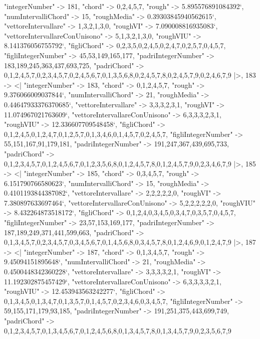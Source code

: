 \documentclass[
]{article}
\begin{document}
\begin{DatasetVerbatim}
    "integerNumber" -> 181,
    "chord" -> {0,2,4,5,7},
    "rough" -> 5.895576891084392`,
    "numIntervalliChord" -> 15,
    "roughMedia" -> 0.39303845940562615`,
    "vettoreIntervallare" -> {1,3,2,1,3,0},
    "roughVI" -> 7.090008816935083`,
    "vettoreIntervallareConUnisono" -> {5,1,3,2,1,3,0},
    "roughVIU" -> 8.141376056755792`,
    "figliChord" -> {{0,2,3,5},{0,2,4,5},{0,2,4,7},{0,2,5,7},{0,4,5,7}},
    "figliIntegerNumber" -> {45,53,149,165,177},
    "padriIntegerNumber" -> {183,189,245,363,437,693,725},
    "padriChord" -> {{0,1,2,4,5,7},{0,2,3,4,5,7},{0,2,4,5,6,7},{0,1,3,5,6,8},{0,2,4,5,7,8},{0,2,4,5,7,9},{0,2,4,6,7,9}}
  |>,
  183 -> <|
    "integerNumber" -> 183,
    "chord" -> {0,1,2,4,5,7},
    "rough" -> 9.376066009037844`,
    "numIntervalliChord" -> 21,
    "roughMedia" -> 0.44647933376370685`,
    "vettoreIntervallare" -> {3,3,3,2,3,1},
    "roughVI" -> 11.074967021763609`,
    "vettoreIntervallareConUnisono" -> {6,3,3,3,2,3,1},
    "roughVIU" -> 12.336607709548458`,
    "figliChord" -> {{0,1,2,4,5},{0,1,2,4,7},{0,1,2,5,7},{0,1,3,4,6},{0,1,4,5,7},{0,2,4,5,7}},
    "figliIntegerNumber" -> {55,151,167,91,179,181},
    "padriIntegerNumber" -> {191,247,367,439,695,733},
    "padriChord" -> {{0,1,2,3,4,5,7},{0,1,2,4,5,6,7},{0,1,2,3,5,6,8},{0,1,2,4,5,7,8},{0,1,2,4,5,7,9},{0,2,3,4,6,7,9}}
  |>,
  185 -> <|
    "integerNumber" -> 185,
    "chord" -> {0,3,4,5,7},
    "rough" -> 6.151790766580623`,
    "numIntervalliChord" -> 15,
    "roughMedia" -> 0.4101193844387082`,
    "vettoreIntervallare" -> {2,2,2,2,2,0},
    "roughVI" -> 7.380897633697464`,
    "vettoreIntervallareConUnisono" -> {5,2,2,2,2,2,0},
    "roughVIU" -> 8.432264873518172`,
    "figliChord" -> {{0,1,2,4},{0,3,4,5},{0,3,4,7},{0,3,5,7},{0,4,5,7}},
    "figliIntegerNumber" -> {23,57,153,169,177},
    "padriIntegerNumber" -> {187,189,249,371,441,599,663},
    "padriChord" -> {{0,1,3,4,5,7},{0,2,3,4,5,7},{0,3,4,5,6,7},{0,1,4,5,6,8},{0,3,4,5,7,8},{0,1,2,4,6,9},{0,1,2,4,7,9}}
  |>,
  187 -> <|
    "integerNumber" -> 187,
    "chord" -> {0,1,3,4,5,7},
    "rough" -> 9.45094151895648`,
    "numIntervalliChord" -> 21,
    "roughMedia" -> 0.4500448342360228`,
    "vettoreIntervallare" -> {3,3,3,3,2,1},
    "roughVI" -> 11.192302875457429`,
    "vettoreIntervallareConUnisono" -> {6,3,3,3,3,2,1},
    "roughVIU" -> 12.453943563242277`,
    "figliChord" -> {{0,1,3,4,5},{0,1,3,4,7},{0,1,3,5,7},{0,1,4,5,7},{0,2,3,4,6},{0,3,4,5,7}},
    "figliIntegerNumber" -> {59,155,171,179,93,185},
    "padriIntegerNumber" -> {191,251,375,443,699,749},
    "padriChord" -> {{0,1,2,3,4,5,7},{0,1,3,4,5,6,7},{0,1,2,4,5,6,8},{0,1,3,4,5,7,8},{0,1,3,4,5,7,9},{0,2,3,5,6,7,9}}

\end{DatasetVerbatim}
\end{document}
